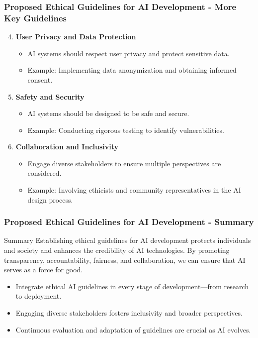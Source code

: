 \documentclass{beamer}
\begin{document}
\begin{frame}[fragile]
    \frametitle{Proposed Ethical Guidelines for AI Development - More Key Guidelines}
    \begin{enumerate}
        \setcounter{enumi}{3} %
        \item \textbf{User Privacy and Data Protection}
            \begin{itemize}
                \item AI systems should respect user privacy and protect sensitive data.
                \item Example: Implementing data anonymization and obtaining informed consent.
            \end{itemize}

        \item \textbf{Safety and Security}
            \begin{itemize}
                \item AI systems should be designed to be safe and secure.
                \item Example: Conducting rigorous testing to identify vulnerabilities.
            \end{itemize}

        \item \textbf{Collaboration and Inclusivity}
            \begin{itemize}
                \item Engage diverse stakeholders to ensure multiple perspectives are considered.
                \item Example: Involving ethicists and community representatives in the AI design process.
            \end{itemize}
    \end{enumerate}
\end{frame}

\begin{frame}[fragile]
    \frametitle{Proposed Ethical Guidelines for AI Development - Summary}
    \begin{block}{Summary}
        Establishing ethical guidelines for AI development protects individuals and society and enhances the credibility of AI technologies. By promoting transparency, accountability, fairness, and collaboration, we can ensure that AI serves as a force for good.
    \end{block}
    
    \begin{itemize}
        \item Integrate ethical AI guidelines in every stage of development—from research to deployment.
        \item Engaging diverse stakeholders fosters inclusivity and broader perspectives.
        \item Continuous evaluation and adaptation of guidelines are crucial as AI evolves.
    \end{itemize}
\end{frame}
\end{document}

